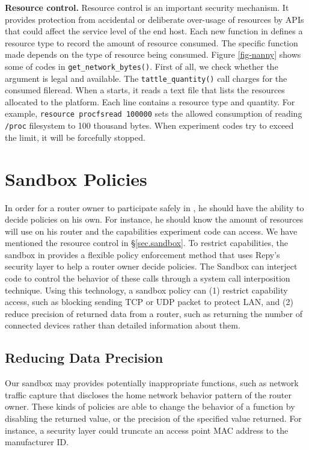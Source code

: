 \textbf{Resource control.} Resource control is an important security mechanism. It provides protection from accidental or deliberate over-usage of resources by APIs that could affect the service level of the end host. Each new function in \sandboxname defines a resource type to record the amount of resource consumed. The specific function made depends on the type of resource being consumed. Figure \ref{fig-nanny} shows some of codes in \texttt{get\_network\_bytes()}. First of all, we check whether the argument is legal and available. The \texttt{tattle\_quantity()} call charges for the consumed fileread. When a \sysname starts, it reads a text file that lists the resources allocated to the platform. Each line contains a resource type and quantity. For example, \texttt{resource procfsread 100000} sets the allowed consumption of reading \texttt{/proc} filesystem to 100 thousand bytes. When experiment codes try to exceed the limit, it will be forcefully stopped.

\section{Sandbox Policies}
\label{sec.policy}
In order for a router owner to participate safely in \sysname, he should have the ability to decide policies on his own. For instance, he should know the amount of resources \sysname will use on his router and the capabilities experiment code can access. We have mentioned the resource control in \S{\ref{sec.sandbox}}. To restrict capabilities, the sandbox in \sysname provides a flexible policy enforcement method that uses Repy's security layer to help a router owner decide policies. The Sandbox can interject code to control the behavior of these calls through a system call interposition technique. Using this technology, a sandbox policy can (1) restrict capability access, such as blocking sending TCP or UDP packet to protect LAN, and (2) reduce precision of returned data from a router, such as returning the number of connected devices rather than detailed information about them.

\subsection{Reducing Data Precision}
Our sandbox may provides potentially inappropriate functions, such as network traffic capture that discloses the home network behavior pattern of the router owner. These kinds of policies are able to change the behavior of a function by disabling the returned value, or the precision of the specified value returned. For instance, a security layer could truncate an access point MAC address to the manufacturer ID.

